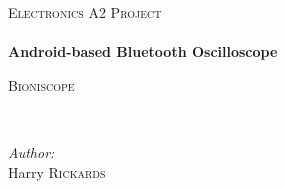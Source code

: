 \begin{titlepage}
  \begin{center}
    \null
    \vspace{0.5cm}

    \textsc{\Large Electronics A2 Project}\\[0.5cm]

    \HRule \\[0.4cm]
    { \huge \bfseries Android-based Bluetooth Oscilloscope \\[0.4cm] }

    \textsc{Bioniscope}

    \HRule \\[1.5cm]

    \begin{flushright} \large
    \emph{Author:} \\
      Harry \textsc{Rickards}
    \end{flushright}

    \vfill

    \Huge{\ccLogo\, \ccAttribution\, \ccShareAlike} \\[1.5cm]

    \large \the\year
  \end{center}
\end{titlepage}
